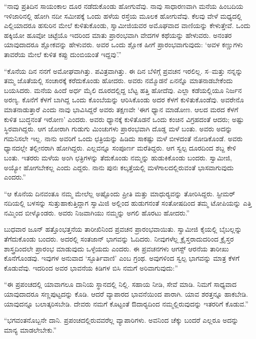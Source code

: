  “ನಾವು ಪ್ರತಿದಿನ ಸಾಯಂಕಾಲ ದೂರ ನಡೆದುಕೊಂಡು ಹೋಗುವೆವು. ನಾವು ಸಾಧಾರಣವಾಗಿ ಮನೆಯ ಹಿಂಬದಿಯ ಇಳಿಜಾರಿನಲ್ಲಿ ಹೋಗಿ ನದೀ ಸಮೀಪಕ್ಕೆ ಒಂದು ಹಳೆಯ ರಸ್ತೆಯ ಮೂಲಕ ಹೋಗುವೆವು. ಕೆಲವು ವೇಳೆ ಮಧ್ಯದಲ್ಲಿ ಎಲ್ಲಿಯಾದರೂ ಹಸುರಿನ ಮೇಲೆ ಕುಳಿತುಕೊಂಡು, ಸ್ವಾಮೀಜಿಯವರ ಅಮೊಘವಾದ ವಾಣಿಯನ್ನು ಕೇಳುತ್ತೇವೆ. ಒಂದು ಹಕ್ಕಿಯೋ ಹೂವೋ ಚಿಟ್ಟೆಯೊ ಇದರಿಂದ ಮಾತು ಪ್ರಾರಂಭವಾಗಿ ವೇದಗಳ ಕಥೆಯನ್ನು ಹೇಳುವರು. ಅನಂತರ ಯಾವುದಾದರೂ ಶ್ಲೋಕವನ್ನು ಹೇಳುವರು. ಅವರ ಒಂದು ಶ್ಲೋಕ ಹೀಗೆ ಪ್ರಾರಂಭವಾಗುವುದು: ‘ಅವಳ ಕಣ್ಣುಗಳು ತಾವರೆಯ ಮೇಲೆ ಕುಳಿತ ಕಪ್ಪು ದುಂಬಿಯಂತೆ ಇದ್ದವು’.” 

 “ಕೊನೆಯ ದಿನ ನನಗೆ ಅಮೋಘವಾಗಿತ್ತು. ಪವಿತ್ರವಾಗಿತ್ತು. ಈ ದಿನ ಬೆಳಿಗ್ಗೆ ಪ್ರವಚನ ಇರಲಿಲ್ಲ. ಸ–ಮತ್ತು ನನ್ನನ್ನು ತಮ್ಮ ಜೊತೆಯಲ್ಲಿ ಸಂಚಾರಕ್ಕೆ ಕರೆದುಕೊಂಡು ಹೋದರು. ಅವರು ನಮ್ಮೊಡನೆ ಏನನ್ನೊ ಮಾತನಾಡಬೇಕೆಂದು ಬಯಸಿದರು. ಮನೆಯ ಹಿಂದೆ ಅರ್ಧ ಮೈಲಿ ದೂರದಲ್ಲಿದ್ದ ಬೆಟ್ಟ ಹತ್ತಿ ಹೋದೆವು. ಎಲ್ಲಾ ಕಡೆಯಲ್ಲಿಯೂ ನಿರ್ಜನ ಅರಣ್ಯ. ಕೊನೆಗೆ ಕೆಳಗೆ ಬಾಗಿದ್ದ ಒಂದು ಕೊಂಬೆಯನ್ನು ಆರಿಸಿಕೊಂಡು ಅದರ ಕೆಳಗೆ ಕುಳಿತುಕೊಂಡೆವು. ಅವರೇನೊ ಮಾತನಾಡುತ್ತಾರೆ ಎಂದು ನಾವು ಭಾವಿಸಿದ್ದರೆ ಅವರು ತಕ್ಷಣವೇ ‘ಈಗ ಧ್ಯಾನ ಮಾಡೋಣ. ಆಲದ ಮರದ ಕೆಳಗೆ ಕುಳಿತ ಬುದ್ಧನಂತೆ ಇರೋಣ’ ಎಂದರು. ಅವರು ಧ್ಯಾನಕ್ಕೆ ಕುಳಿತೊಡನೆ ಒಂದು ಕಂಚಿನ ವಿಗ್ರಹದಂತೆ ಆದರು; ಅಷ್ಟು ಸ್ಥಿರವಾಗಿದ್ದರು. ಆಗ ಜೋರಾಗಿ ಗುಡುಗು ಮಿಂಚುಗಳು ಪ್ರಾರಂಭವಾಗಿ ದೊಡ್ಡ ಮಳೆ ಬಂತು. ಅವರು ಅದನ್ನು ಗಮನಿಸಲೇ ಇಲ್ಲ. ನಾನು ಅವರಿಗೆ ಒಂದು ಛತ್ರಿಯನ್ನು ಹಿಡಿದು ಸಾಕಷ್ಟು ಮಳೆ ಬೀಳದಂತೆ ನೋಡಿಕೊಂಡೆ. ಅವರು ಧ್ಯಾನದಲ್ಲೇ ತಲ್ಲೀನರಾಗಿ ಹೋಗಿದ್ದರು. ಎಲ್ಲವನ್ನೂ ಸಂಪೂರ್ಣ ಮರೆತಿದ್ದರು. ಆಗ ಸ್ವಲ್ಪ ದೂರದಿಂದ ಶಬ್ದ ಕೇಳಿ ಬಂತು. ಇತರರು ಮಳೆಯ ಅಂಗಿ ಛತ್ರಿಗಳನ್ನು ತೆದುಕೊಂಡು ನಮ್ಮನ್ನು ಹುಡುಕಿಕೊಂಡು ಬಂದರು. ಸ್ವಾಮೀಜಿ, ಅಯ್ಯೋ ಹೋಗಬೇಕಲ್ಲ ಎಂದು ಎದ್ದರು. ನಾನು ಪುನಃ ಕಲ್ಕತ್ತೆಯಲ್ಲಿ ಮಳೆಗಾಲದಲ್ಲಿರುವಂತೆ ಭಾಸವಾಗುವುದು ಎಂದರು.” 

 “ಆ ಕೊನೆಯ ದಿನವಂತೂ ನಮ್ಮ ಮೇಲೆಲ್ಲ ಅಷ್ಟೊಂದು ಪ್ರೀತಿ ಮತ್ತು ಮಾಧುರ‍್ಯವನ್ನು ತೋರಿಸಿದ್ದರು. ಸ್ಟೀಮರ್ ನದಿಯಲ್ಲಿ ಬಳಸನ್ನು ಸುತ್ತುಹಾಕುತ್ತಿದ್ದಾಗ ಸ್ವಾಮಿಜಿ ಅಲ್ಲಿಂದ ಹುಡುಗನಂತೆ ಸಂತೋಷದಿಂದ ತಮ್ಮ ಟೋಪಿಯನ್ನು ಎತ್ತಿ ನಮ್ಮಿಂದ ಬೀಳ್ಕೊಂಡರು. ಅವರು ನಿಜವಾಗಿಯು ನಮ್ಮನ್ನು ಅಗಲಿ ಹೊರಟು ಹೋದರು.” 

\delimiter

 ಬುಧವಾರ ಜೂನ್ ಹತ್ತೊಂಭತ್ತನೆಯ ತಾರೀಖಿನಿಂದ ಪ್ರವಚನ ಪ್ರಾರಂಭವಾಯಿತು. ಸ್ವಾಮೀಜಿ ಕೈಯಲ್ಲಿ ಬೈಬಲ್ಲನ್ನು ತೆಗೆದುಕೊಂಡು ಬಂದರು. ಅದರಲ್ಲಿ ಸಂತಜಾನ್ ಭಾಗವನ್ನು ಓದಿದರು. ನೀವುಗಳೆಲ್ಲ ಕ್ರೈಸ್ತರಾದುದರಿಂದ ಕ್ರೈಸ್ತರ ಶಾಸ್ತ್ರದಿಂದಲೇ ಪ್ರಾರಂಭ ಮಾಡುವುದು ಒಳ್ಳೆಯದು ಎಂದರು. ಈ ಪ್ರವಚನಗಳು ಆಗಸ್ಟ್ ಆರನೆಯ ತಾರೀಖು ಕೊನೆಗೊಂಡವು. ಇವುಗಳ ಅನುವಾದ ‘ಸ್ಫೂರ್ತಿವಾಣಿ’ ಎಂಬ ಗ್ರಂಥ. ಅವುಗಳಿಂದ ಸ್ವಲ್ಪ ಭಾಗವನ್ನು ಮಾತ್ರ ಕೆಳಗೆ ಕೊಡುವೆವು. ಇದರಿಂದ ಅವರ ಭಾವನೆಯ ಕಿಡಿಗಳ ಬಿಸಿ ನಮಗೆ ಅರಿವಾಗುವುದು:” 

 “ಈ ಪ್ರಪಂಚದಲ್ಲಿ ಯಾವಾಗಲೂ ದಾನಿಯ ಸ್ಥಾನದಲ್ಲಿ ನಿಲ್ಲಿ. ಸಹಾಯ ನೀಡಿ, ಸೇವೆ ಮಾಡಿ. ನಿಮಗೆ ಸಾಧ್ಯವಾದ ಯಾವುದಾದರೂ ಸಣ್ಣಪುಟ್ಟದನ್ನು ಕೊಡಿ. ಆದರೆ ವ್ಯಾಪಾರದ ಭಾವನೆಯಿಂದ ಪಾರಾಗಿ. ಯಾವ ಶರತ್ತನ್ನೂ ಹಾಕಬೇಡಿ. ಯಾವುದನ್ನೂ ಬಲಾತ್ಕರಿಸಬೇಡಿ. ದೇವರು ನಮಗೆ ಕೊಟ್ಟಂತೆ ಔದಾರ‍್ಯದಿಂದ ನಮ್ಮಲ್ಲಿರುವುದನ್ನು ಇತರರಿಗೆ ಕೊಡುವ.” 

 “ಭಗವಂತನೊಬ್ಬನೇ ದಾನಿ. ಪ್ರಪಂಚದಲ್ಲಿರುವವರೆಲ್ಲ ವ್ಯಾಪಾರಿಗಳು. ಅವನಿಂದ ಚೆಕ್ಕು ಬಂದರೆ ಎಲ್ಲರೂ ಅದನ್ನು ಮಾನ್ಯ ಮಾಡಲೇಬೇಕು.” 

